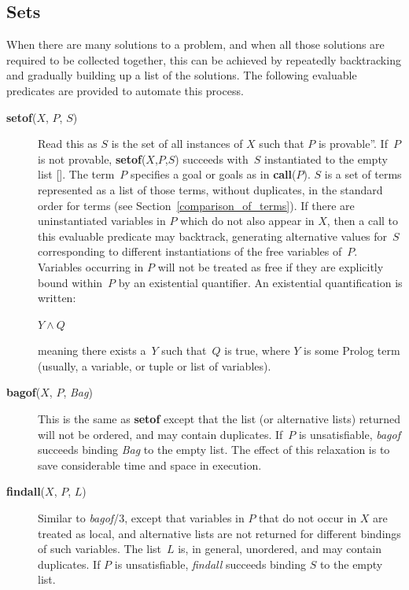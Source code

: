 \subsection{Sets}

When there are many solutions to a problem, and when all those solutions are
required to be collected together, this can be achieved by repeatedly
backtracking and gradually building up a list of the solutions.
The following evaluable predicates are provided to automate this process.

\begin{description}
\item[{\bf setof}($X$, $P$, $S$)] 
    Read this as $S$ is the set of all instances of $X$ such that $P$
    is provable''.
    If~$P$ is not provable, {\bf setof}($X$,$P$,$S$) succeeds with~$S$
    instantiated to the empty list [\/].
    The term~$P$ specifies a goal or goals as in {\bf call}($P$).
    $S$ is a set of terms represented as a list of those terms,
    without duplicates, in the standard order for terms
    (see Section~\ref{comparison_of_terms}).
    If there are uninstantiated variables in $P$
    which do not also appear in $X$,
    then a call to this evaluable predicate may backtrack,
    generating alternative values for~$S$ corresponding to different
    instantiations of the free variables of~$P$.
    Variables occurring in $P$ will not be treated as free if they are
    explicitly bound within~$P$ by an existential quantifier.
    An existential quantification is written:
    \begin{center}
    {$Y\wedge Q$}\index{$\wedge$}
    \end{center}
    meaning there exists a~$Y$ such that~$Q$ is true,
    where $Y$ is some Prolog term
    (usually, a variable, or tuple or list of variables).

\item[{\bf bagof}($X$, $P$, {\em Bag})]
    This is the same as {\bf setof} except that the list
    (or alternative lists) returned will not be ordered,
    and may contain duplicates.
    If~$P$ is unsatisfiable, {\em bagof} succeeds binding {\em Bag}
    to the empty list.
    The effect of this relaxation is to save considerable
    time and space in execution.

\item[{\bf findall}($X$, $P$, $L$)]
    Similar to {\em bagof}/3,
    except that variables in $P$ that do not occur in $X$ are treated as local,
    and alternative lists are not returned for different bindings
    of such variables.
    The list~$L$ is, in general, unordered, and may contain duplicates.
    If $P$ is unsatisfiable,
    {\em findall} succeeds binding $S$ to the empty list.


\end{description}
